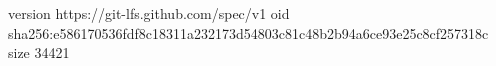 version https://git-lfs.github.com/spec/v1
oid sha256:e586170536fdf8c18311a232173d54803c81c48b2b94a6ce93e25c8cf257318c
size 34421
